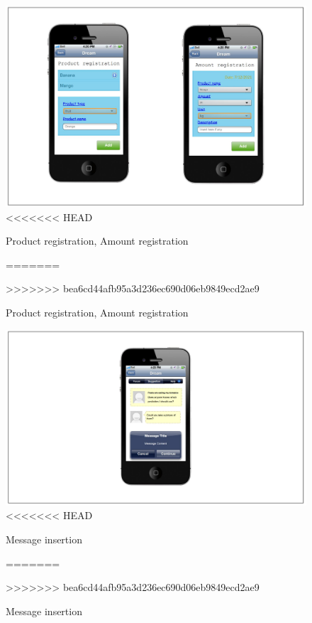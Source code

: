 \begin{figure}[H]
	\centering
    \includegraphics[page=1, width=\textwidth]{Images/product_amount_registration.JPG}
<<<<<<< HEAD
	\caption{\label{fig:FE_image2}Product registration, Amount registration}
=======
	\caption{\label{fig:FE_image}Product registration, Amount registration}
>>>>>>> bea6cd44afb95a3d236ec690d06eb9849ecd2ae9
\end{figure}



\begin{figure}[H]
	\centering
    \includegraphics[page=1, width=\textwidth]{Images/message_insertion.JPG}
<<<<<<< HEAD
	\caption{\label{fig:FE_image3}Message insertion}
=======
	\caption{\label{fig:FE_image}Message insertion}
>>>>>>> bea6cd44afb95a3d236ec690d06eb9849ecd2ae9
\end{figure}

